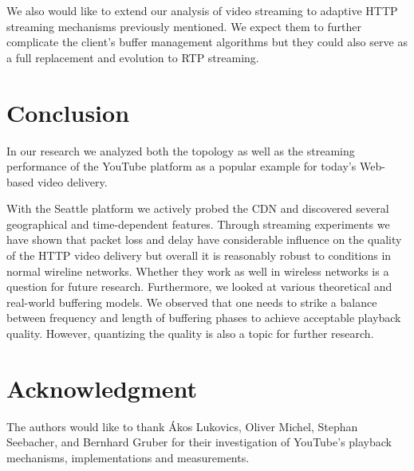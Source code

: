 
We also would like to extend our analysis of video streaming to adaptive HTTP streaming mechanisms previously mentioned. We expect them to further complicate the client's buffer management algorithms but they could also serve as a full replacement and evolution to RTP streaming.




\section{Conclusion}
\label{sec:conclusion}

In our research we analyzed both the topology as well as the streaming performance of the YouTube platform as a popular example for today's Web-based video delivery. 

With the Seattle platform we actively probed the CDN and discovered several geographical and time-dependent features. Through streaming experiments we have shown that packet loss and delay have considerable influence on the quality of the HTTP video delivery but overall it is reasonably robust to conditions in normal wireline networks. Whether they work as well in wireless networks is a question for future research. Furthermore, we looked at various theoretical and real-world buffering models. We observed that one needs to strike a balance between frequency and length of buffering phases to achieve acceptable playback quality. However, quantizing the quality is also a topic for further research.




\section*{Acknowledgment}
\label{sec:acknowledgments}

The authors would like to thank Ákos Lukovics, Oliver Michel, Stephan Seebacher, and Bernhard Gruber for their investigation of YouTube’s playback mechanisms, implementations and measurements.



